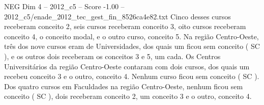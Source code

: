 \begin{textsample}{NEG Dim 4 – 2012\_c5 – Score -1.00 – 2012\_c5/enade\_2012\_tec\_gest\_fin\_8526ca4e82.txt}
Cinco desses cursos receberam conceito 2, seis cursos receberam conceito 3, oito cursos receberam conceito 4, o conceito modal, e o outro curso, conceito 5.
Na região Centro-Oeste, três dos nove cursos eram de Universidades, dos quais um ficou sem conceito ( SC ), e os outros dois receberam os conceitos 3 e 5, um cada.
Os Centros Universitários da região Centro-Oeste contaram com dois cursos, dos quais um recebeu conceito 3 e o outro, conceito 4.
Nenhum curso ficou sem conceito ( SC ).
Dos quatro cursos em Faculdades na região Centro-Oeste, nenhum ficou sem conceito ( SC ), dois receberam conceito 2, um conceito 3 e o outro, conceito 4.

\end{textsample}

